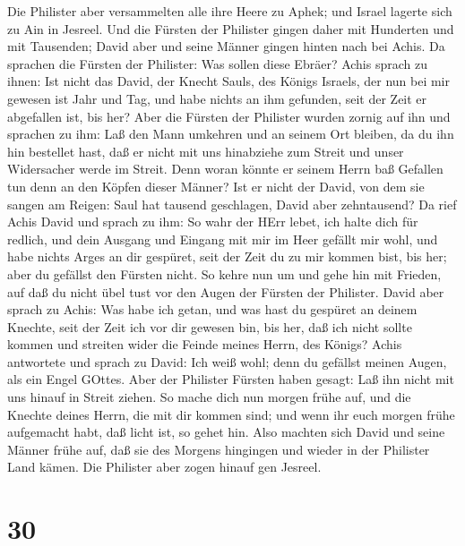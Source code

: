 Die Philister aber versammelten alle ihre Heere zu Aphek;
und Israel lagerte sich zu Ain in Jesreel.  Und die Fürsten
der Philister gingen daher mit Hunderten und mit Tausenden; David aber
und seine Männer gingen hinten nach bei Achis.  Da sprachen
die Fürsten der Philister: Was sollen diese Ebräer? Achis sprach zu
ihnen: Ist nicht das David, der Knecht Sauls, des Königs Israels, der
nun bei mir gewesen ist Jahr und Tag, und habe nichts an ihm gefunden,
seit der Zeit er abgefallen ist, bis her?  Aber die Fürsten
der Philister wurden zornig auf ihn und sprachen zu ihm: Laß den Mann
umkehren und an seinem Ort bleiben, da du ihn hin bestellet hast, daß er
nicht mit uns hinabziehe zum Streit und unser Widersacher werde im
Streit. Denn woran könnte er seinem Herrn baß Gefallen tun denn an den
Köpfen dieser Männer?  Ist er nicht der David, von dem sie
sangen am Reigen: Saul hat tausend geschlagen, David aber zehntausend?
 Da rief Achis David und sprach zu ihm: So wahr der HErr
lebet, ich halte dich für redlich, und dein Ausgang und Eingang mit mir
im Heer gefällt mir wohl, und habe nichts Arges an dir gespüret, seit
der Zeit du zu mir kommen bist, bis her; aber du gefällst den Fürsten
nicht.  So kehre nun um und gehe hin mit Frieden, auf daß du
nicht übel tust vor den Augen der Fürsten der Philister. 
David aber sprach zu Achis: Was habe ich getan, und was hast du gespüret
an deinem Knechte, seit der Zeit ich vor dir gewesen bin, bis her, daß
ich nicht sollte kommen und streiten wider die Feinde meines Herrn, des
Königs?  Achis antwortete und sprach zu David: Ich weiß
wohl; denn du gefällst meinen Augen, als ein Engel GOttes. Aber der
Philister Fürsten haben gesagt: Laß ihn nicht mit uns hinauf in Streit
ziehen.  So mache dich nun morgen frühe auf, und die
Knechte deines Herrn, die mit dir kommen sind; und wenn ihr euch morgen
frühe aufgemacht habt, daß licht ist, so gehet hin.  Also
machten sich David und seine Männer frühe auf, daß sie des Morgens
hingingen und wieder in der Philister Land kämen. Die Philister aber
zogen hinauf gen Jesreel.

\hypertarget{section-29}{%
\section{30}\label{section-29}}

